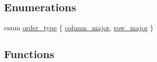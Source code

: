 \subsection*{Enumerations}
\begin{DoxyCompactItemize}
\item 
enum \mbox{\hyperlink{namespaceglm_1_1io_a3497781803fe594a37177e05ab2a795f}{order\+\_\+type}} \{ \mbox{\hyperlink{namespaceglm_1_1io_a3497781803fe594a37177e05ab2a795faab661780f7f081ee11c34be9b0742229}{column\+\_\+major}}, 
\mbox{\hyperlink{namespaceglm_1_1io_a3497781803fe594a37177e05ab2a795fad080bb2f932ea4078fd0fc10ea1c991c}{row\+\_\+major}}
 \}
\end{DoxyCompactItemize}
\subsection*{Functions}
